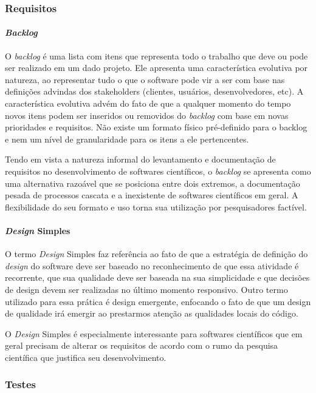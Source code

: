 \documentclass[
	article,			%
	11pt,				%
	oneside,			%
	a4paper,			%
	english,			%
	brazil,				%
	sumario=tradicional
	]{abntex2}
\begin{document}
\subsubsection*{Requisitos}

\paragraph*{\emph{Backlog}}
O \emph{backlog} é uma lista com itens que representa todo o trabalho que deve ou pode ser realizado em um dado projeto. Ele apresenta uma característica evolutiva por natureza, ao representar tudo o que o software pode vir a ser com base nas definições advindas dos stakeholders (clientes, usuários, desenvolvedores, etc). A característica evolutiva advém do fato de que a qualquer momento do tempo novos itens podem ser inseridos ou removidos do \emph{backlog} com base em novas prioridades e requisitos. Não existe um formato físico pré-definido para o backlog e nem um nível de granularidade para os itens a ele pertencentes.

Tendo em vista a natureza informal do levantamento e documentação de requisitos no desenvolvimento de softwares científicos, o \emph{backlog} se apresenta como uma alternativa razoável que se posiciona entre dois extremos, a documentação pesada de processos cascata e a inexistente de softwares científicos em geral. A flexibilidade do seu formato e uso torna sua utilização por pesquisadores factível.

\paragraph*{\emph{Design} Simples}
O termo \emph{Design} Simples faz referência ao fato de que a estratégia de definição do \emph{design} do software deve ser baseado no reconhecimento de que essa atividade é recorrente, que sua qualidade deve ser baseada na sua simplicidade e que decisões de design devem ser realizadas no último momento responsivo. Outro termo utilizado para essa prática é design emergente, enfocando o fato de que um design de qualidade irá emergir ao prestarmos atenção as qualidades locais do código.

O \emph{Design} Simples é especialmente interessante para softwares científicos que em geral precisam de alterar os requisitos de acordo com o rumo da pesquisa científica que justifica seu desenvolvimento.

\subsubsection*{Testes}
\end{document}
